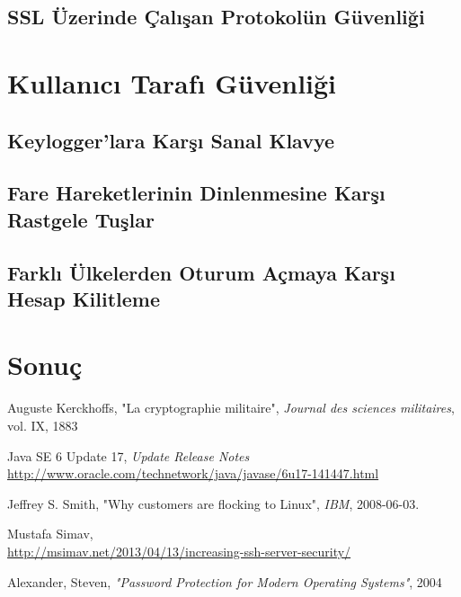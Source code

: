 \documentclass[11pt]{report}
\begin{document}
\section{SSL Üzerinde Çalışan Protokolün Güvenliği}


\chapter{Kullanıcı Tarafı Güvenliği}
\section{Keylogger'lara Karşı Sanal Klavye}
\section{Fare Hareketlerinin Dinlenmesine Karşı Rastgele Tuşlar}
\section{Farklı Ülkelerden Oturum Açmaya Karşı Hesap Kilitleme}

\chapter{Sonuç}


\begin{thebibliography}{9}

  Auguste Kerckhoffs,
  "La cryptographie militaire",
  \emph{Journal des sciences militaires},
  vol. IX,
  1883

  Java SE 6 Update 17, \emph{Update Release Notes} \\
  \url{http://www.oracle.com/technetwork/java/javase/6u17-141447.html}

  Jeffrey S. Smith,
  "Why customers are flocking to Linux",
  \emph{IBM},
  2008-06-03.

  Mustafa Simav, \\
  \url{http://msimav.net/2013/04/13/increasing-ssh-server-security/}

  Alexander, Steven, 
  \emph{"Password Protection for Modern Operating Systems"},
  2004

\end{thebibliography}
\end{document}
